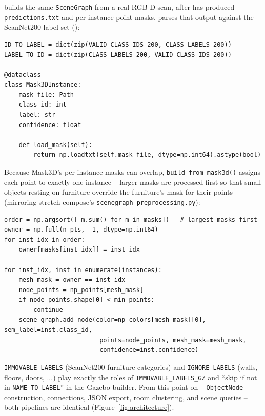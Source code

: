 \documentclass[11pt]{article}
\begin{document}
 builds the same
\texttt{SceneGraph} from a real RGB-D scan, after
 has produced \texttt{predictions.txt} and
per-instance point masks. 
parses that output against the ScanNet200 label set
():

\begin{lstlisting}[caption={\texttt{mask3d\_interface.py}: loading Mask3D predictions}]
ID_TO_LABEL = dict(zip(VALID_CLASS_IDS_200, CLASS_LABELS_200))
LABEL_TO_ID = dict(zip(CLASS_LABELS_200, VALID_CLASS_IDS_200))

@dataclass
class Mask3DInstance:
    mask_file: Path
    class_id: int
    label: str
    confidence: float

    def load_mask(self):
        return np.loadtxt(self.mask_file, dtype=np.int64).astype(bool)
\end{lstlisting}

Because Mask3D's per-instance masks can overlap, \texttt{build\_from\_mask3d()}
assigns each point to exactly one instance -- larger masks are processed
first so that small objects resting on furniture override the furniture's
mask for their points (mirroring stretch-compose's
\texttt{scenegraph\_preprocessing.py}):

\begin{lstlisting}[caption={\texttt{build\_scene\_graph.py}: one-point-one-owner mask resolution}]
order = np.argsort([-m.sum() for m in masks])   # largest masks first
owner = np.full(n_pts, -1, dtype=np.int64)
for inst_idx in order:
    owner[masks[inst_idx]] = inst_idx

for inst_idx, inst in enumerate(instances):
    mesh_mask = owner == inst_idx
    node_points = np_points[mesh_mask]
    if node_points.shape[0] < min_points:
        continue
    scene_graph.add_node(color=np_colors[mesh_mask][0], sem_label=inst.class_id,
                          points=node_points, mesh_mask=mesh_mask,
                          confidence=inst.confidence)
\end{lstlisting}

\texttt{IMMOVABLE\_LABELS} (ScanNet200 furniture categories) and
\texttt{IGNORE\_LABELS} (walls, floors, doors, ...) play exactly the roles of
\texttt{IMMOVABLE\_LABELS\_GZ} and ``skip if not in \texttt{NAME\_TO\_LABEL}''
in the Gazebo builder. From this point on -- \texttt{ObjectNode} construction,
connections, JSON export, room clustering, and scene queries -- both
pipelines are identical (Figure~\ref{fig:architecture}).
\end{document}
